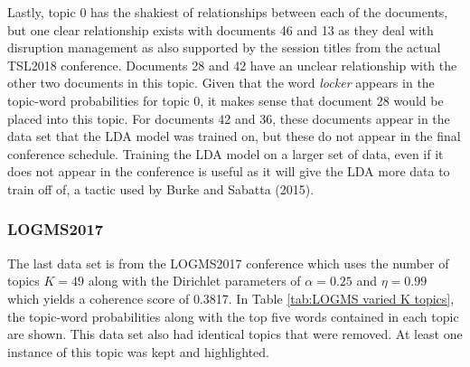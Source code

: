\documentclass[a4paper, 12pt, twoside]{article}
\numberwithin{equation}{section} %
\begin{document}
Lastly, topic 0 has the shakiest of relationships between each of the documents, but one clear relationship exists with documents 46 and 13 as they deal with disruption management as also supported by the session titles from the actual TSL2018 conference. Documents 28 and 42 have an unclear relationship with the other two documents in this topic. Given that the word \textit{locker} appears in the topic-word probabilities for topic 0, it makes sense that document 28 would be placed into this topic. For documents 42 and 36, these documents appear in the data set that the LDA model was trained on, but these do not appear in the final conference schedule. Training the LDA model on a larger set of data, even if it does not appear in the conference is useful as it will give the LDA more data to train off of, a tactic used by Burke and Sabatta (2015).

\subsubsection{LOGMS2017}

The last data set is from the LOGMS2017 conference which uses the number of topics $K = 49$ along with the Dirichlet parameters of $\alpha = 0.25$ and $\eta = 0.99$ which yields a coherence score of 0.3817. In Table \ref{tab:LOGMS varied K topics}, the topic-word probabilities along with the top five words contained in each topic are shown. This data set also had identical topics that were removed. At least one instance of this topic was kept and highlighted.
\end{document}
